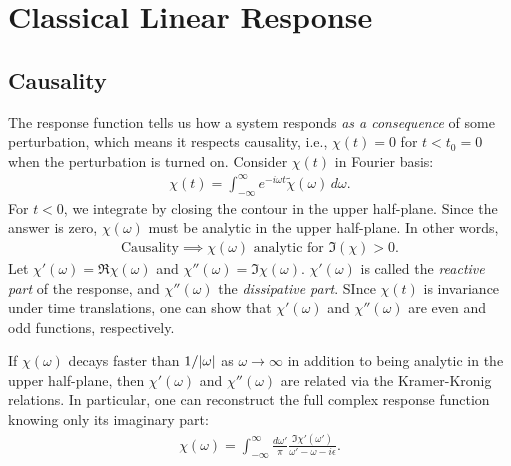 \documentclass[reprint,
nofootinbib,
amsmath,amssymb,
aps]{revtex4-1}
\newcommand{\f}[2]{\frac{#1}{#2}}
\begin{document}
\section{Classical Linear Response}\label{sec:classical}

%
\subsection{Causality}
The response function tells us how a system responds \textit{as a consequence} of some perturbation, which means it respects causality, i.e., $\chi(t) = 0$ for $t < t_0 = 0$ when the perturbation is turned on. Consider $\chi(t)$ in Fourier basis:
\begin{align*}
\chi(t) = \int_{-\infty}^\infty  e^{-i\omega t } \tilde{\chi}(\omega) \,d\omega.
\end{align*}
For $t<0$, we integrate by closing the contour in the upper half-plane. Since the answer is zero, $\chi(\omega)$ must be analytic in the upper half-plane. In other words, 
\begin{align*}
\text{Causality} \implies \chi(\omega) \text{ analytic for } \Im(\chi) > 0.
\end{align*}
Let $\chi'(\omega) = \Re \chi(\omega)$ and $\chi''(\omega) = \Im \chi(\omega)$. $\chi'(\omega)$ is called the \textit{reactive part} of the response, and $\chi''(\omega)$ the \textit{dissipative part}. SInce $\chi(t)$ is invariance under time translations, one can show that $\chi'(\omega)$ and $\chi''(\omega)$ are even and odd functions, respectively.

If $\chi(\omega)$ decays faster than $1/\abs{\omega}$ as $\omega \to \infty$ in addition to being analytic in the upper half-plane, then $\chi'(\omega)$ and $\chi''(\omega)$ are related via the Kramer-Kronig relations. In particular, one can reconstruct the full complex response function knowing only its imaginary part:
\begin{align*}
\chi(\omega) = \int_{-\infty}^\infty \f{d\omega'}{\pi} \f{\Im \chi'(\omega')}{\omega' - \omega - i\epsilon}.
\end{align*}
\end{document}
